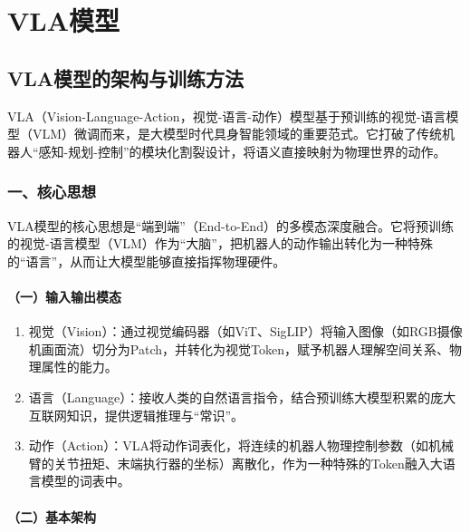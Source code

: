 \hypertarget{vlaux6a21ux578b}{%
\chapter{VLA模型}\label{vlaux6a21ux578b}}

\hypertarget{vlaux6a21ux578bux7684ux67b6ux6784ux4e0eux8badux7ec3ux65b9ux6cd5}{%
\section{VLA模型的架构与训练方法}\label{vlaux6a21ux578bux7684ux67b6ux6784ux4e0eux8badux7ec3ux65b9ux6cd5}}

VLA（Vision-Language-Action，视觉-语言-动作）模型基于预训练的视觉-语言模型（VLM）微调而来，是大模型时代具身智能领域的重要范式。它打破了传统机器人``感知-规划-控制''的模块化割裂设计，将语义直接映射为物理世界的动作。

\hypertarget{ux4e00ux6838ux5fc3ux601dux60f3-13}{%
\subsection{一、核心思想}\label{ux4e00ux6838ux5fc3ux601dux60f3-13}}

VLA模型的核心思想是``端到端''（End-to-End）的多模态深度融合。它将预训练的视觉-语言模型（VLM）作为``大脑''，把机器人的动作输出转化为一种特殊的``语言''，从而让大模型能够直接指挥物理硬件。

\hypertarget{ux4e00ux8f93ux5165ux8f93ux51faux6a21ux6001}{%
\subsubsection{（一）输入输出模态}\label{ux4e00ux8f93ux5165ux8f93ux51faux6a21ux6001}}

\begin{enumerate}
\def\labelenumi{\arabic{enumi}.}
\item
  视觉（Vision）：通过视觉编码器（如ViT、SigLIP）将输入图像（如RGB摄像机画面流）切分为Patch，并转化为视觉Token，赋予机器人理解空间关系、物理属性的能力。
\item
  语言（Language）：接收人类的自然语言指令，结合预训练大模型积累的庞大互联网知识，提供逻辑推理与``常识''。
\item
  动作（Action）：VLA将动作词表化，将连续的机器人物理控制参数（如机械臂的关节扭矩、末端执行器的坐标）离散化，作为一种特殊的Token融入大语言模型的词表中。
\end{enumerate}

\hypertarget{ux4e8cux57faux672cux67b6ux6784}{%
\subsubsection{（二）基本架构}\label{ux4e8cux57faux672cux67b6ux6784}}

